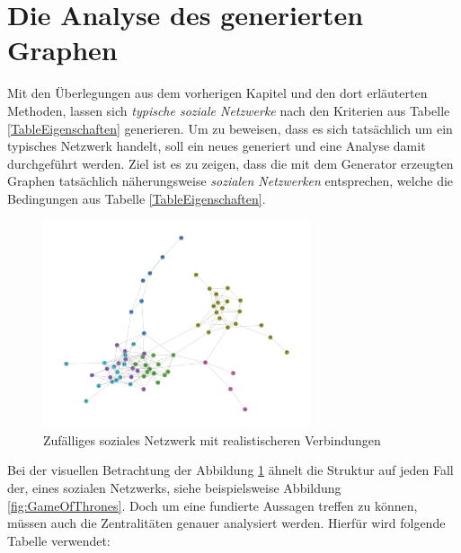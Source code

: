 \section{Die Analyse des generierten Graphen}
Mit den Überlegungen aus dem vorherigen Kapitel und den dort erläuterten Methoden, lassen sich \textit{typische soziale Netzwerke} nach den Kriterien aus Tabelle \ref{TableEigenschaften} generieren. Um zu beweisen, dass es sich tatsächlich um ein typisches Netzwerk handelt, soll ein neues generiert und eine Analyse damit durchgeführt werden. Ziel ist es zu zeigen, dass die mit dem Generator erzeugten Graphen tatsächlich näherungsweise \textit{sozialen Netzwerken} entsprechen, welche die Bedingungen aus Tabelle \ref{TableEigenschaften}.

\FloatBarrier
\begin{figure}[h!]
    \centering
    \hspace*{-2cm}
    \includegraphics[width=0.7\textwidth]{Graphics/Random_moreConnections.jpg}
    \caption{Zufälliges soziales Netzwerk mit realistischeren Verbindungen}
    \label{fig:SNA}
\end{figure}

\FloatBarrier

Bei der visuellen Betrachtung der Abbildung \ref{fig:SNA} ähnelt die Struktur auf jeden Fall der, eines sozialen Netzwerks, siehe beispielsweise Abbildung \ref{fig:GameOfThrones}. Doch um eine fundierte Aussagen treffen zu können, müssen auch die Zentralitäten genauer analysiert werden. Hierfür wird folgende Tabelle verwendet:

